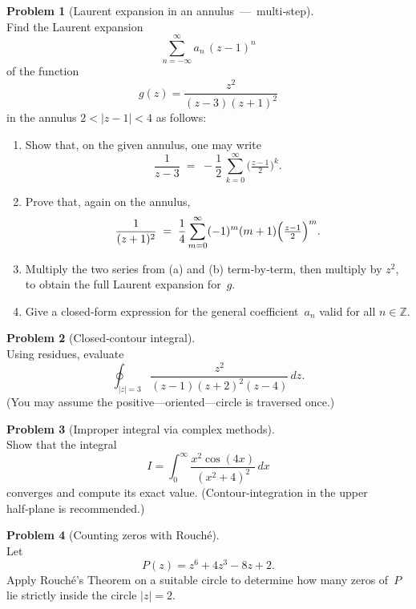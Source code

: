 \documentclass[12pt]{article}
\theoremstyle{definition} %
\newtheorem{problem}{Problem}
\theoremstyle{plain} %
\begin{document}
  \pagebreak
  \begin{problem}[Laurent expansion in an annulus — multi‑step]\mbox{}\\[4pt]
  Find the Laurent expansion
  \[
    \sum_{n=-\infty}^{\infty}a_{n}\,(z-1)^{n}
  \]
  of the function
  \[
    g(z)=\frac{z^{2}}{(z-3)(z+1)^{2}}
  \]
  in the annulus \(2<\lvert z-1\rvert<4\) as follows:
  \begin{enumerate}[label=(\alph*),itemsep=6pt]
    \item Show that, on the given annulus, one may write
          \[
            \frac{1}{z-3}
            \;=\;
            -\frac{1}{2}\,
            \sum_{k=0}^{\infty}\bigl(\tfrac{z-1}{2}\bigr)^{k}.
          \]
    \item Prove that, again on the annulus, 
          \[
            \frac{1}{(z+1)^{2}}
            \;=\;
            \frac{1}{4}
            \sum_{m=0}^{\infty}(-1)^{m}(m+1)
            \Bigl(\tfrac{z-1}{2}\Bigr)^{m}.
          \]
    \item Multiply the two series from (a) and (b) term‑by‑term, then multiply by $z^{2}$, to obtain the full Laurent expansion for $g$.
    \item Give a closed‑form expression for the general coefficient $a_{n}$ valid for all $n\in\mathbb{Z}$.
  \end{enumerate}
  \end{problem}
  
  \pagebreak
  \begin{problem}[Closed‑contour integral]\mbox{}\\[4pt]
  Using residues, evaluate
  \[
    \oint_{\lvert z\rvert=3}
    \frac{z^{2}}{(z-1)(z+2)^{2}(z-4)}\,dz.
  \]
  (You may assume the positive—oriented—circle is traversed once.)
  \end{problem}
  
  \pagebreak
  \begin{problem}[Improper integral via complex methods]\mbox{}\\[4pt]
  Show that the integral
  \[
    I=\int_{0}^{\infty}\frac{x^{2}\cos(4x)}{(x^{2}+4)^{2}}\,dx
  \]
  converges and compute its exact value.  (Contour‑integration in the upper half‑plane is recommended.)
  \end{problem}
  
  \pagebreak
  \begin{problem}[Counting zeros with Rouché]\mbox{}\\[4pt]
  Let
  \[
    P(z)=z^{6}+4z^{3}-8z+2.
  \]
  Apply Rouché’s Theorem on a suitable circle to determine how many zeros of $P$ lie strictly inside the circle \(\lvert z\rvert=2\).
  \end{problem}
  
\end{document}
